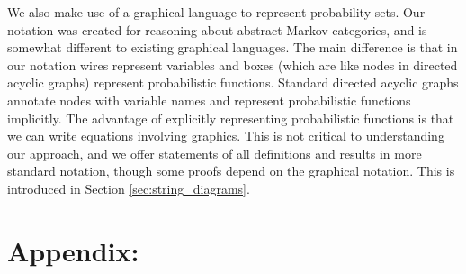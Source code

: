 \documentclass{article}
\theoremstyle{plain}
\theoremstyle{definition}
\begin{document}
We also make use of a graphical language to represent probability sets. Our notation was created for reasoning about abstract Markov categories, and is somewhat different to existing graphical languages. The main difference is that in our notation wires represent variables and boxes (which are like nodes in directed acyclic graphs) represent probabilistic functions. Standard directed acyclic graphs annotate nodes with variable names and represent probabilistic functions implicitly. The advantage of explicitly representing probabilistic functions is that we can write equations involving graphics. This is not critical to understanding our approach, and we offer statements of all definitions and results in more standard notation, though some proofs depend on the graphical notation. This is introduced in Section \ref{sec:string_diagrams}.

% 







% 
% 
% 
% 




\appendix
\newpage
\section*{Appendix:}

% 
\end{document}
